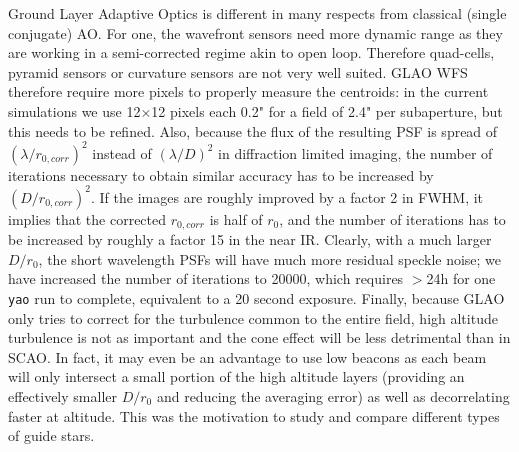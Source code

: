 \documentclass[aas_macros,10pt]{article}
\begin{document}
Ground Layer Adaptive Optics is different in many respects from classical (single conjugate) AO. For one, the wavefront sensors need more dynamic range as they are working in a semi-corrected regime akin to open loop. Therefore quad-cells, pyramid sensors or curvature sensors are not very well suited. GLAO WFS therefore require more pixels to properly measure the centroids: in the current simulations we use 12$\times$12 pixels each 0.2" for a field of 2.4" per subaperture, but this needs to be refined. Also, because the flux of the resulting PSF is spread of $(\lambda/r_{0,corr})^2$ instead of  $(\lambda/D)^2$ in diffraction limited imaging, the number of iterations necessary to obtain similar accuracy has to be increased by $(D/r_{0,corr})^2$. If the images are roughly improved by a factor 2 in FWHM, it implies that the corrected $r_{0,corr}$ is half of $r_0$, and the number of iterations has to be increased by roughly a factor 15 in the near IR. Clearly, with a much larger $D/r_0$, the short wavelength PSFs will have much more residual speckle noise; we have increased the number of iterations to 20000, which requires $>$24h for one \texttt{yao} run to complete, equivalent to a 20 second exposure. Finally, because GLAO only tries to correct for the turbulence common to the entire field, high altitude turbulence is not as important and the cone effect will be less detrimental than in SCAO. In fact, it may even be an advantage to use low beacons as each beam will only intersect a small portion of the high altitude layers (providing an effectively smaller $D/r_0$ and reducing the averaging error) as well as decorrelating faster at altitude. This was the motivation to study and compare different types of guide stars. 
\end{document}
